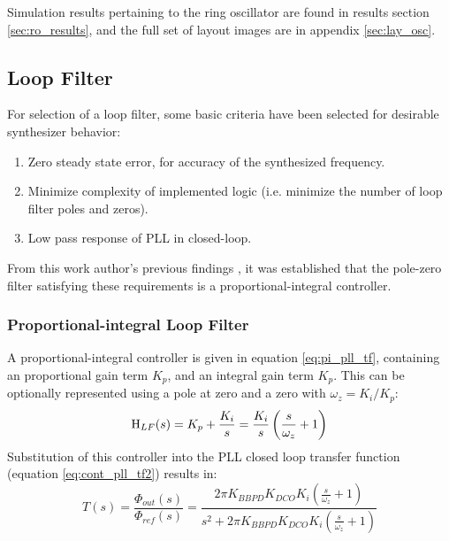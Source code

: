 		Simulation results pertaining to the ring oscillator are found in results section \ref{sec:ro_results}, and the full set of layout images are in appendix \ref{sec:lay_osc}.


	\pagebreak\FloatBarrier
	\subsection{Loop Filter}
	For selection of a loop filter, some basic criteria have been selected for desirable synthesizer behavior:
	\begin{enumerate}[itemsep=0pt,label=\protect\mycirc{\arabic*}]
		\setlength\itemsep{-0.8em}
		\item Zero steady state error, for accuracy of the synthesized frequency.
		\item Minimize complexity of implemented logic (i.e. minimize the number of loop filter poles and zeros).
		\item Low pass response of PLL in closed-loop.
	\end{enumerate}
	From this work author's previous findings \cite{Me}, it was established that the pole-zero filter satisfying these requirements is a proportional-integral controller.

\subsubsection{Proportional-integral Loop Filter}
 A proportional-integral controller \cite{ogata_2010_pid} is given in equation \ref{eq:pi_pll_tf}, containing an proportional gain term $K_p$, and an integral gain term $K_p$. This can be optionally represented using a pole at zero and a zero with $\omega_z = K_i/K_p$:
			\begin{equation} \label{eq:pi_pll_tf}
				\textnormal{H}_{LF}(s) = K_p + \frac{K_i}{s}  = \frac{K_i}{s}\left(\frac{s}{\omega_z} + 1\right) 
			\end{equation}
			Substitution of this controller into the PLL closed loop transfer function (equation \ref{eq:cont_pll_tf2}) results in:
			\begin{equation}\label{eq:pi_bbpdpll_tf}
				T(s) = \frac{\Phi_{out}(s)}{\Phi_{ref}(s)} =  \frac{ 2\pi K_{BBPD}K_{DCO}K_{i} \left(\frac{s}{\omega_z} + 1\right) }{s^2 + 2\pi K_{BBPD}K_{DCO}K_{i}\left(\frac{s}{\omega_z} + 1\right) }
			\end{equation}

